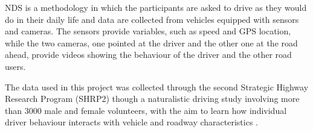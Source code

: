 NDS is a methodology in which the participants are asked to drive as they would do in their daily life \cite{Udrive} and data are collected from vehicles equipped  with sensors and cameras. The sensors provide variables, such as speed and GPS location, while the two cameras, one pointed at the driver and the other one at the road ahead, provide videos showing the behaviour of the driver and the other road users. 

The data used in this project was collected through the second Strategic Highway Research Program (SHRP2) though a naturalistic driving study involving more than 3000 male and female volunteers, with the aim to learn how individual driver behaviour interacts with vehicle and roadway characteristics \cite{hallmark2011evaluation}. 

